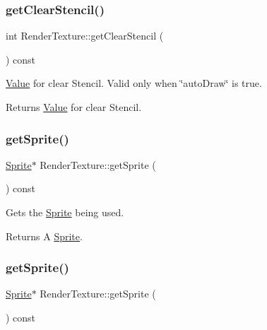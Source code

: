 \subsubsection{\texorpdfstring{get\+Clear\+Stencil()}{getClearStencil()}\hspace{0.1cm}{\footnotesize\ttfamily [2/2]}}
{\footnotesize\ttfamily int Render\+Texture\+::get\+Clear\+Stencil (\begin{DoxyParamCaption}{ }\end{DoxyParamCaption}) const\hspace{0.3cm}{\ttfamily [inline]}}

\hyperlink{classValue}{Value} for clear Stencil. Valid only when \char`\"{}auto\+Draw\char`\"{} is true.

\begin{DoxyReturn}{Returns}
\hyperlink{classValue}{Value} for clear Stencil. 
\end{DoxyReturn}
\mbox{\label{classRenderTexture_a89c3bcda8dbca417127adbce86cc3bb6}} 
\subsubsection{\texorpdfstring{get\+Sprite()}{getSprite()}\hspace{0.1cm}{\footnotesize\ttfamily [1/2]}}
{\footnotesize\ttfamily \hyperlink{classSprite}{Sprite}$\ast$ Render\+Texture\+::get\+Sprite (\begin{DoxyParamCaption}{ }\end{DoxyParamCaption}) const\hspace{0.3cm}{\ttfamily [inline]}}

Gets the \hyperlink{classSprite}{Sprite} being used.

\begin{DoxyReturn}{Returns}
A \hyperlink{classSprite}{Sprite}. 
\end{DoxyReturn}
\mbox{\label{classRenderTexture_a89c3bcda8dbca417127adbce86cc3bb6}} 
\subsubsection{\texorpdfstring{get\+Sprite()}{getSprite()}\hspace{0.1cm}{\footnotesize\ttfamily [2/2]}}
{\footnotesize\ttfamily \hyperlink{classSprite}{Sprite}$\ast$ Render\+Texture\+::get\+Sprite (\begin{DoxyParamCaption}{ }\end{DoxyParamCaption}) const\hspace{0.3cm}{\ttfamily [inline]}}

